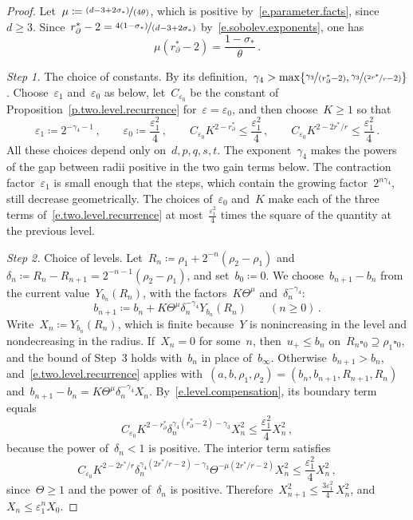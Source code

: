 \documentclass[11pt,letterpaper]{article}
\numberwithin{equation}{section}
\theoremstyle{definition}
\newcommand{\eps}{\varepsilon}
\newcommand{\nf}{\nicefrac}
\newcommand{\cu}{\square}
\begin{document}
\begin{proof}
Let~$\mu\coloneqq\nf{(d-3+2\sigma_*)}{(4\theta)}$, which is positive by~\eqref{e.parameter.facts}, since~$d\geq3$. Since~$r_\partial^*-2=\nf{4(1-\sigma_*)}{(d-3+2\sigma_*)}$ by~\eqref{e.sobolev.exponents}, one has
\begin{equation}
	\mu(r_\partial^*-2)=\frac{1-\sigma_*}{\theta}\,.
	\label{e.level.compensation}
\end{equation}
\smallskip

\emph{Step 1.} The choice of constants. By its definition,~$\gamma_4>\max\{\nf{\gamma_3}{(r_\partial^*-2)},\nf{\gamma_3}{(\nf{2r^*}r-2)}\}$. Choose~$\eps_1$ and~$\eps_0$ as below, let~$C_{\eps_0}$ be the constant of Proposition~\ref{p.two.level.recurrence} for~$\eps=\eps_0$, and then choose~$K\geq1$ so that
\begin{equation*}
	\eps_1\coloneqq2^{-\gamma_4-1}\,,\qquad \eps_0\coloneqq\frac{\eps_1^2}4\,,\qquad C_{\eps_0}K^{2-r_\partial^*}\leq\frac{\eps_1^2}4\,,\qquad C_{\eps_0}K^{2-2r^*/r}\leq\frac{\eps_1^2}4\,.
\end{equation*}
All these choices depend only on~$d,p,q,s,t$. The exponent~$\gamma_4$ makes the powers of the gap between radii positive in the two gain terms below. The contraction factor~$\eps_1$ is small enough that the steps, which contain the growing factor~$2^{n\gamma_4}$, still decrease geometrically. The choices of~$\eps_0$ and~$K$ make each of the three terms of~\eqref{e.two.level.recurrence} at most~$\frac{\eps_1^2}4$ times the square of the quantity at the previous level.

\smallskip

\emph{Step 2.} Choice of levels. Let~$R_n\coloneqq\rho_1+2^{-n}(\rho_2-\rho_1)$ and~$\delta_n\coloneqq R_n-R_{n+1}=2^{-n-1}(\rho_2-\rho_1)$, and set~$b_0\coloneqq0$. We choose~$b_{n+1}-b_n$ from the current value~$Y_{b_n}(R_n)$, with the factors~$K\Theta^\mu$ and~$\delta_n^{-\gamma_4}$:
\begin{equation*}
	b_{n+1}\coloneqq b_n+K\Theta^\mu\delta_n^{-\gamma_4}Y_{b_n}(R_n)\qquad(n\geq0)\,.
\end{equation*}
Write~$X_n\coloneqq Y_{b_n}(R_n)$, which is finite because~$Y$ is nonincreasing in the level and nondecreasing in the radius. If~$X_n=0$ for some~$n$, then~$u_+\leq b_n$ on~$R_n\cu_0\supseteq\rho_1\cu_0$, and the bound of Step~3 holds with~$b_n$ in place of~$b_\infty$. Otherwise~$b_{n+1}>b_n$, and~\eqref{e.two.level.recurrence} applies with~$(a,b,\rho_1,\rho_2)=(b_n,b_{n+1},R_{n+1},R_n)$ and~$b_{n+1}-b_n=K\Theta^\mu\delta_n^{-\gamma_4}X_n$. By~\eqref{e.level.compensation}, its boundary term equals
\begin{equation*}
	C_{\eps_0}K^{2-r_\partial^*}\delta_n^{\gamma_4(r_\partial^*-2)-\gamma_3}X_n^2\leq\frac{\eps_1^2}4X_n^2\,,
\end{equation*}
because the power of~$\delta_n<1$ is positive. The interior term satisfies
\begin{equation*}
	C_{\eps_0}K^{2-2r^*/r}\delta_n^{\gamma_4(2r^*/r-2)-\gamma_3}\Theta^{-\mu(2r^*/r-2)}X_n^2\leq\frac{\eps_1^2}4X_n^2\,,
\end{equation*}
since~$\Theta\geq1$ and the power of~$\delta_n$ is positive. Therefore~$X_{n+1}^2\leq\frac{3\eps_1^2}4\,X_n^2$, and~$X_n\leq\eps_1^nX_0$.


\end{proof}
\end{document}
